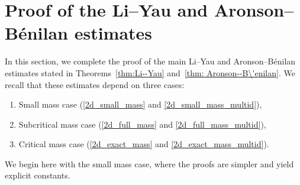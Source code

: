 \documentclass[11pt,a4paper]{article}
\numberwithin{equation}{section}
\theoremstyle{plain}
\theoremstyle{remark}
\begin{document}



 
 

\section{Proof of the Li--Yau and Aronson--B\'enilan estimates}\label{sec:endproof}


In this section, we complete the proof of the main  Li--Yau and Aronson--B\'enilan estimates stated in Theorems~\ref{thm:Li--Yau} and~\ref{thm: Aronson--B\'enilan}. We recall that these estimates depend on three cases:
\begin{enumerate}
\item Small mass case (\ref{2d_small_mass} and \ref{2d_small_mass_multid}),
\item Subcritical mass case (\ref{2d_full_mass} and \ref{2d_full_mass_multid}),
\item Critical mass case (\ref{2d_exact_mass} and \ref{2d_exact_mass_multid}).
\end{enumerate}
We begin here with the small mass case, where the proofs are simpler and yield  explicit constants.
\end{document}
